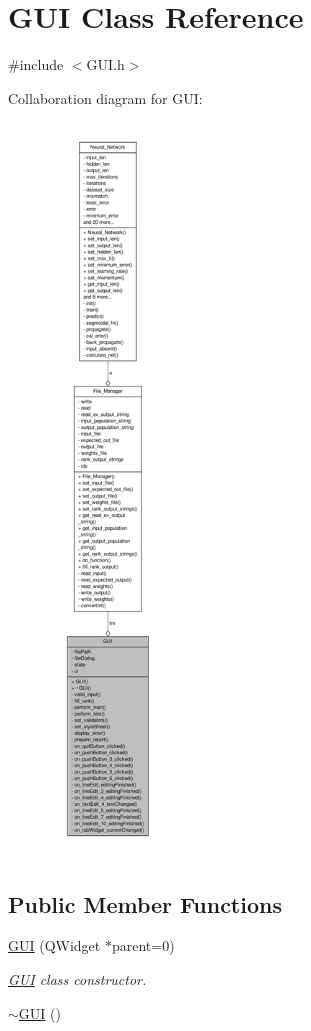 \hypertarget{a00002}{\section{G\-U\-I Class Reference}
\label{d7/d46/a00002}
}


{\ttfamily \#include $<$G\-U\-I.\-h$>$}



Collaboration diagram for G\-U\-I\-:
\nopagebreak
\begin{figure}[H]
\begin{center}
\leavevmode
\includegraphics[height=550pt]{d5/df9/a00044}
\end{center}
\end{figure}
\subsection*{Public Member Functions}
\begin{DoxyCompactItemize}
\item 
\hyperlink{a00002_acb0ba8c6fc121d814d30560e2c29f2fe}{G\-U\-I} (Q\-Widget $\ast$parent=0)
\begin{DoxyCompactList}\small\item\em \hyperlink{a00002}{G\-U\-I} class constructor. \end{DoxyCompactList}\item 
\hyperlink{a00002_ac9cae2328dcb5d83bdfaeca49a2eb695}{$\sim$\-G\-U\-I} ()
\end{DoxyCompactItemize}
